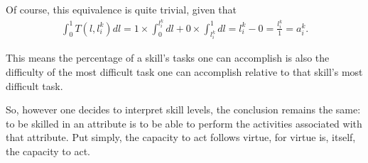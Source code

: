 {\begin{definition}[Skill]
        Of course, this equivalence is quite trivial, given that
        \begin{gather}
            \int_{0}^{1}{
            T(l, l_{i}^{k})
            dl
            }
            =
            1 \times \int_{0}^{l_{i}^{k}}{dl} +
            0 \times \int_{l_{i}^{k}}^{1}{dl}
            =
            l_{i}^{k} - 0
            =
            \frac{l_{i}^{k}}{1}
            =
            a_{i}^{k}
            .
        \end{gather}

        This means the percentage of a skill's tasks one can accomplish is also
        the difficulty of the most difficult task one can accomplish relative to that
        skill's most difficult task.

        So, however one decides to interpret skill levels, the conclusion remains the
        same: to be skilled in an attribute is to be able to perform the activities
        associated with that attribute. Put simply, the capacity to act follows virtue,
        for virtue is, itself, the capacity to act.
    \end{definition}
}


